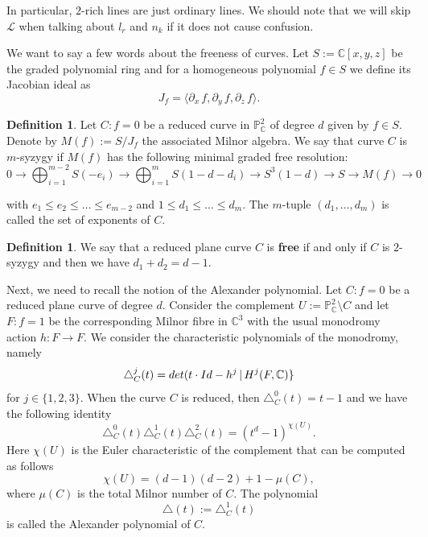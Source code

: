 \documentclass[11pt]{article}
\theoremstyle{plain}
\theoremstyle{definition}
\newtheorem{definition}[thm]{Definition}
\theoremstyle{plain}
\renewcommand\leq{\leqslant}
\begin{document}
In particular, $2$-rich lines are just ordinary lines. We should note that we will skip $\mathcal{L}$ when talking about $l_{r}$ and $n_{k}$ if it does not cause confusion.

We want to say a few words about the freeness of curves. Let $S := \mathbb{C}[x,y,z]$ be the graded polynomial ring and for a homogeneous polynomial $f \in S$ we define its Jacobian ideal as $$J_{f} = \langle \partial_{x}\, f, \partial_{y} \, f, \partial_{z} \, f \rangle.$$
\begin{definition}
\label{hom}
Let $C : f=0$ be a reduced curve in $\mathbb{P}^{2}_{\mathbb{C}}$ of degree $d$ given by $f \in S$. Denote by $M(f) := S/ J_{f}$ the associated Milnor algebra. We say that curve $C$ is $m$-syzygy if $M(f)$ has the following minimal graded free resolution:
$$0 \rightarrow \bigoplus_{i=1}^{m-2}S(-e_{i}) \rightarrow \bigoplus_{i=1}^{m}S(1-d - d_{i}) \rightarrow S^{3}(1-d)\rightarrow S \rightarrow M(f) \rightarrow 0$$

with $e_{1} \leq e_{2} \leq \ldots \leq e_{m-2}$ and $1\leq d_{1} \leq \ldots \leq d_{m}$. 
The $m$-tuple $(d_{1}, \ldots, d_{m})$ is called the set of exponents of $C$.
\end{definition}
\begin{definition}
We say that a reduced plane curve $C$ is \textbf{free} if and only if $C$ is $2$-syzygy and then we have $d_{1}+d_{2}=d-1$.
\end{definition}
Next, we need to recall the notion of the Alexander polynomial. Let $C : f=0$ be a reduced plane curve of degree $d$. Consider the complement $U:=\mathbb{P}^{2}_{\mathbb{C}}\setminus C$  and let $F : f=1$ be the corresponding Milnor fibre in $\mathbb{C}^{3}$ with the usual monodromy action 
$h : F \rightarrow F$. We consider the characteristic polynomials of the monodromy, namely
$$\triangle_{C}^{j}(t) = {\rm det}( t \cdot {\rm Id}-h^{j} \,| \, H^{j}(F,\mathbb{C})\}$$
for $j \in\{1,2,3\}$. When the curve $C$ is reduced, then $\triangle_{C}^{0}(t) = t-1$ and we have the following identity
\begin{equation}
\triangle_{C}^{0}(t)\triangle_{C}^{1}(t)\triangle_{C}^{2}(t) = (t^{d}-1)^{\chi(U)}.
\end{equation}
Here $\chi(U)$ is the Euler characteristic of the complement that can be computed as follows
$$\chi(U) = (d-1)(d-2) +1 -\mu(C),$$
where $\mu(C)$ is the total Milnor number of $C$. The polynomial $$\triangle(t) :=\triangle_{C}^{1}(t)$$
is called the Alexander polynomial of $C$.
\end{document}

